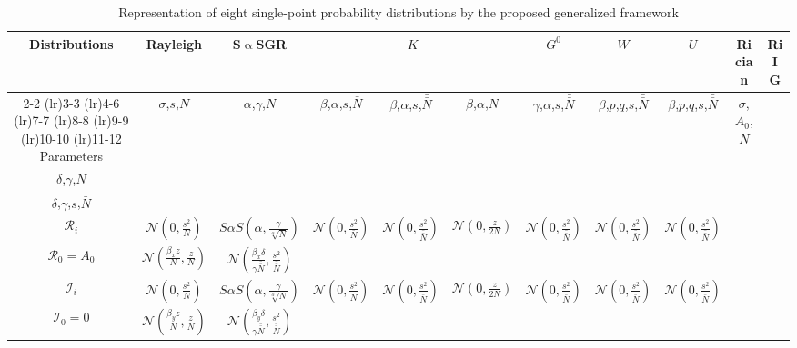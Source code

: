\documentclass[journal]{IEEEtran}
\begin{document}
\begin{sidewaystable*}
	\caption{Representation of eight single-point probability distributions by the proposed generalized framework}\label{Table1}
	\scriptsize
	\setlength{\tabcolsep}{2.5pt}
	\begin{tabular}{cccccccccccc}
		\toprule
		Distributions & Rayleigh & S$\upalpha$SGR & \multicolumn{3}{c}{$K$} & $G^0$ & $W$ & $U$  & Rician  &\multicolumn{2}{c}{RiIG} \\
		\cmidrule(lr){2-2}
		\cmidrule(lr){3-3}
		\cmidrule(lr){4-6}
		\cmidrule(lr){7-7}
		\cmidrule(lr){8-8}
		\cmidrule(lr){9-9}
		\cmidrule(lr){10-10}
		\cmidrule(lr){11-12}
		Parameters & $\sigma$,$s$,$N$ & $\alpha$,$\gamma$,$N$ & $\beta$,$\alpha$,$s$,$\bar{N}$ & $\beta$,$\alpha$,$s$,$\bar{\bar{N}}$ & $\beta$,$\alpha$,$N$ & $\gamma$,$\alpha$,$s$,$\bar{\bar{N}}$ & $\beta$,$p$,$q$,$s$,$\bar{\bar{N}}$ & $\beta$,$p$,$q$,$s$,$\bar{\bar{N}}$ & $\sigma$,$A_{0}$,$N$ & \makecell{$\alpha$,$\beta (\beta_{x},\beta_{y})$, \\ $\delta$,$\gamma$,$N$} & \makecell{$\alpha$,$\beta (\beta_{x},\beta_{y})$, \\ $\delta$,$\gamma$,$s$,$\bar{\bar{N}}$} \\
		\midrule
		$\mathcal{R}_{i}$ & $ \mathcal{N}\left(0,\frac{s^{2}}{N}\right)$ & $ S \alpha S\left(\alpha, \frac{\gamma}{\sqrt[\alpha]{N}}\right)$ &
		$ \mathcal{N}\left(0,\frac{s^{2}}{\bar{N}}\right)$ & $ \mathcal{N}\left(0,\frac{s^{2}}{\bar{\bar{N}}}\right)$ & $ \mathcal{N}\left(0,\frac{z}{2N}\right)$ & $ \mathcal{N}\left(0,\frac{s^{2}}{\bar{\bar{N}}}\right)$ & $ \mathcal{N}\left(0,\frac{s^{2}}{\bar{\bar{N}}}\right)$ & $ \mathcal{N}\left(0,\frac{s^{2}}{\bar{\bar{N}}}\right)$ & \makecell{$ \mathcal{N}\left(0,\frac{s^{2}}{N}\right)$ \\ $\mathcal{R}_{0} = A_{0}$}  & $ \mathcal{N}\left(\frac{\beta_{x}z}{N},\frac{z}{N}\right)$  & $ \mathcal{N}\left(\frac{\beta_{x}\delta}{\gamma \bar{\bar{N}}},\frac{s^{2}}{\bar{\bar{N}}}\right)$ \\
		\midrule
		$\mathcal{I}_{i}$ & $ \mathcal{N}\left(0,\frac{s^{2}}{N}\right)$ & $ S \alpha S\left(\alpha, \frac{\gamma}{\sqrt[\alpha]{N}}\right)$ &
		$ \mathcal{N}\left(0,\frac{s^{2}}{\bar{N}}\right)$ & $ \mathcal{N}\left(0,\frac{s^{2}}{\bar{\bar{N}}}\right)$ & $ \mathcal{N}\left(0,\frac{z}{2N}\right)$ & $ \mathcal{N}\left(0,\frac{s^{2}}{\bar{\bar{N}}}\right)$ & $ \mathcal{N}\left(0,\frac{s^{2}}{\bar{\bar{N}}}\right)$ & $ \mathcal{N}\left(0,\frac{s^{2}}{\bar{\bar{N}}}\right)$ & \makecell{$ \mathcal{N}\left(0,\frac{s^{2}}{N}\right)$ \\ $\mathcal{I}_{0} = 0$}  & $ \mathcal{N}\left(\frac{\beta_{y}z}{N},\frac{z}{N}\right)$  & $ \mathcal{N}\left(\frac{\beta_{y}\delta}{\gamma \bar{\bar{N}}},\frac{s^{2}}{\bar{\bar{N}}}\right)$ \\

\end{tabular}
\end{sidewaystable*}
\end{document}

